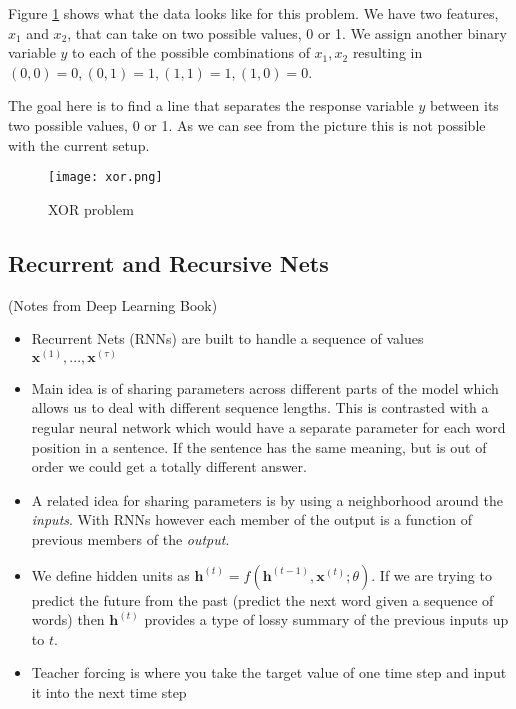 Figure \ref{fig:xor} shows what the data looks like for this problem. We have two features, $x_1$ and $x_2$, that can take on two possible values, 0 or 1. We assign another binary variable $y$ to each of the possible combinations of $x_1, x_2$ resulting in $(0,0) = 0, (0,1)=1, (1,1)=1, (1,0)=0$.

The goal here is to find a line that separates the response variable $y$ between its two possible values, 0 or 1. As we can see from the picture this is not possible with the current setup.

 \begin{figure} \label{fig:xor}
\caption{XOR problem}
\centering
 \texttt{[image: xor.png]}
 \end{figure}
 


 
 
 
 \subsection{Recurrent and Recursive Nets}
 
(Notes from Deep Learning Book)

\begin{itemize}
\item Recurrent Nets (RNNs) are built to handle a sequence of values $\mathbf{x}^{(1)},..., \mathbf{x}^{(\tau)}$
\item Main idea is of sharing parameters across different parts of the model which allows us to deal with different sequence lengths. This is contrasted with a regular neural network which would have a separate parameter for each word position in a sentence. If the sentence has the same meaning, but is out of order we could get a totally different answer.
\item A related idea for sharing parameters is by using a neighborhood around the \emph{inputs}. With RNNs however each member of the output is a function of previous members of the \emph{output}.
\item We define hidden units as $\mathbf{h}^{(t)} = f(\mathbf{h}^{(t-1)}, \mathbf{x}^{(t)}; \theta)$. If we are trying to predict the future from the past (predict the next word given a sequence of words) then $\mathbf{h}^{(t)}$ provides a type of lossy summary of the previous inputs up to $t$. 

\item Teacher forcing is where you take the target value of one time step and input it into the next time step

\end{itemize}
 